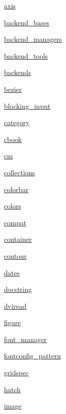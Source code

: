 \begin{DoxyCompactItemize}
 \hyperlink{namespacematplotlib_1_1axis}{axis}
\item 
 \hyperlink{namespacematplotlib_1_1backend__bases}{backend\+\_\+bases}
\item 
 \hyperlink{namespacematplotlib_1_1backend__managers}{backend\+\_\+managers}
\item 
 \hyperlink{namespacematplotlib_1_1backend__tools}{backend\+\_\+tools}
\item 
 \hyperlink{namespacematplotlib_1_1backends}{backends}
\item 
 \hyperlink{namespacematplotlib_1_1bezier}{bezier}
\item 
 \hyperlink{namespacematplotlib_1_1blocking__input}{blocking\+\_\+input}
\item 
 \hyperlink{namespacematplotlib_1_1category}{category}
\item 
 \hyperlink{namespacematplotlib_1_1cbook}{cbook}
\item 
 \hyperlink{namespacematplotlib_1_1cm}{cm}
\item 
 \hyperlink{namespacematplotlib_1_1collections}{collections}
\item 
 \hyperlink{namespacematplotlib_1_1colorbar}{colorbar}
\item 
 \hyperlink{namespacematplotlib_1_1colors}{colors}
\item 
 \hyperlink{namespacematplotlib_1_1compat}{compat}
\item 
 \hyperlink{namespacematplotlib_1_1container}{container}
\item 
 \hyperlink{namespacematplotlib_1_1contour}{contour}
\item 
 \hyperlink{namespacematplotlib_1_1dates}{dates}
\item 
 \hyperlink{namespacematplotlib_1_1docstring}{docstring}
\item 
 \hyperlink{namespacematplotlib_1_1dviread}{dviread}
\item 
 \hyperlink{namespacematplotlib_1_1figure}{figure}
\item 
 \hyperlink{namespacematplotlib_1_1font__manager}{font\+\_\+manager}
\item 
 \hyperlink{namespacematplotlib_1_1fontconfig__pattern}{fontconfig\+\_\+pattern}
\item 
 \hyperlink{namespacematplotlib_1_1gridspec}{gridspec}
\item 
 \hyperlink{namespacematplotlib_1_1hatch}{hatch}
\item 
 \hyperlink{namespacematplotlib_1_1image}{image}
\item 

\end{DoxyCompactItemize}
